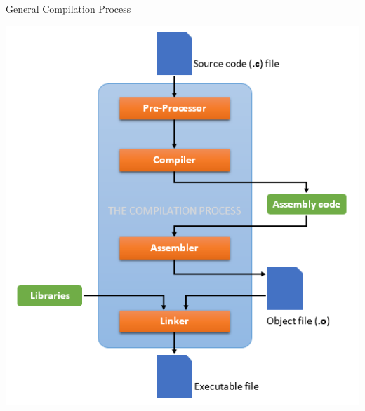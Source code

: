 \documentclass{beamer}
\begin{document}
\begin{frame}{General Compilation Process}
    \begin{overprint}
        \centering
        \includegraphics[scale=0.4]{images/high_level_compilation.png}\cite{high_level_compilation}


\end{overprint}
\end{frame}
\end{document}
